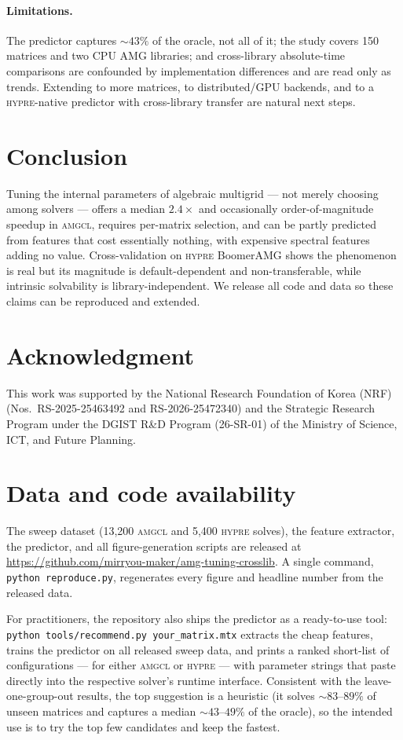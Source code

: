 \documentclass[11pt]{article}
\newcommand{\amgcl}{\textsc{amgcl}}
\newcommand{\hypre}{\textsc{hypre}}
\begin{document}
\paragraph{Limitations.}
The predictor captures $\sim\!43\%$ of the oracle, not all of it; the study
covers 150 matrices and two CPU AMG libraries; and cross-library absolute-time
comparisons are confounded by implementation differences and are read only as
trends. Extending to more matrices, to distributed/GPU backends, and to a
\hypre{}-native predictor with cross-library transfer are natural next steps.

\section{Conclusion}
\label{sec:conclusion}

Tuning the internal parameters of algebraic multigrid --- not merely choosing
among solvers --- offers a median $2.4\times$ and occasionally
order-of-magnitude speedup in \amgcl{}, requires per-matrix selection, and can
be partly predicted from features that cost essentially nothing, with expensive
spectral features adding no value. Cross-validation on \hypre{} BoomerAMG shows
the phenomenon is real but its magnitude is default-dependent and
non-transferable, while intrinsic solvability is library-independent. We
release all code and data so these claims can be reproduced and extended.

\section*{Acknowledgment}
This work was supported by the National Research Foundation of Korea (NRF)
(Nos.\ RS-2025-25463492 and RS-2026-25472340) and the Strategic Research
Program under the DGIST R\&D
Program (26-SR-01) of the Ministry of Science, ICT, and Future Planning.

\section*{Data and code availability}
The sweep dataset (13{,}200 \amgcl{} and 5{,}400 \hypre{} solves), the feature
extractor, the predictor, and all figure-generation scripts are released at
\url{https://github.com/mirryou-maker/amg-tuning-crosslib}. A single command,
\texttt{python reproduce.py}, regenerates every figure and headline number from
the released data.

For practitioners, the repository also ships the predictor as a ready-to-use
tool: \texttt{python tools/recommend.py your\_matrix.mtx} extracts the cheap
features, trains the predictor on all released sweep data, and prints a ranked
short-list of configurations --- for either \amgcl{} or \hypre{} --- with
parameter strings that paste directly into the respective solver's runtime
interface. Consistent with the leave-one-group-out results, the top suggestion
is a heuristic (it solves $\sim\!83$--$89\%$ of unseen matrices and captures a
median $\sim\!43$--$49\%$ of the oracle), so the intended use is to try the top
few candidates and keep the fastest.
\end{document}
